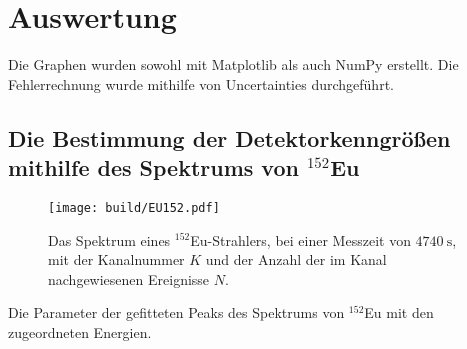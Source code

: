 \section{Auswertung}
\label{sec:Auswertung}
Die Graphen wurden sowohl mit Matplotlib \cite{matplotlib} als auch NumPy \cite{numpy} erstellt. Die
Fehlerrechnung wurde mithilfe von Uncertainties \cite{uncertainties} durchgeführt.


\subsection{Die Bestimmung der Detektorkenngrößen mithilfe des Spektrums von $^{152}$Eu} 
\begin{figure}
	\centering
	\texttt{[image: build/EU152.pdf]}
	\caption{Das Spektrum eines $^{152}$Eu-Strahlers, bei einer Messzeit von $\SI{4740}{\second}$, mit der Kanalnummer $K$ und der Anzahl der im Kanal nachgewiesenen Ereignisse $N$.}
	\label{fig:1}
\end{figure}
\begin{table}
	\centering
	\caption{Die Parameter der gefitteten Peaks des Spektrums von $^{152}$Eu mit den zugeordneten Energien.}
	
	\label{tab:datsigmatab}
\end{table}


